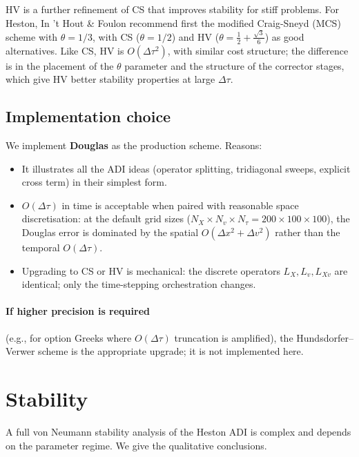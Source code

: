 \documentclass[11pt]{article}
\theoremstyle{plain}
\theoremstyle{definition}
\theoremstyle{remark}
\begin{document}
HV is a further refinement of CS that improves stability for stiff problems. For Heston, In 't Hout \& Foulon recommend first the modified Craig-Sneyd (MCS) scheme with $\theta = 1/3$, with CS ($\theta = 1/2$) and HV ($\theta = \tfrac12 + \tfrac{\sqrt3}{6}$) as good alternatives. Like CS, HV is $O(\Delta\tau^2)$, with similar cost structure; the difference is in the placement of the $\theta$ parameter and the structure of the corrector stages, which give HV better stability properties at large $\Delta\tau$.

\subsection{Implementation choice}

We implement \textbf{Douglas} as the production scheme. Reasons:
\begin{itemize}[topsep=2pt]
    \item It illustrates all the ADI ideas (operator splitting, tridiagonal sweeps, explicit cross term) in their simplest form.
    \item $O(\Delta\tau)$ in time is acceptable when paired with reasonable space discretisation: at the default grid sizes ($N_X \times N_v \times N_\tau = 200 \times 100 \times 100$), the Douglas error is dominated by the spatial $O(\Delta x^2 + \Delta v^2)$ rather than the temporal $O(\Delta\tau)$.
    \item Upgrading to CS or HV is mechanical: the discrete operators $L_X, L_v, L_{Xv}$ are identical; only the time-stepping orchestration changes.
\end{itemize}

\paragraph{If higher precision is required} (e.g., for option Greeks where $O(\Delta\tau)$ truncation is amplified), the Hundsdorfer--Verwer scheme is the appropriate upgrade; it is not implemented here.

\section{Stability}

A full von Neumann stability analysis of the Heston ADI is complex and depends on the parameter regime. We give the qualitative conclusions.
\end{document}
